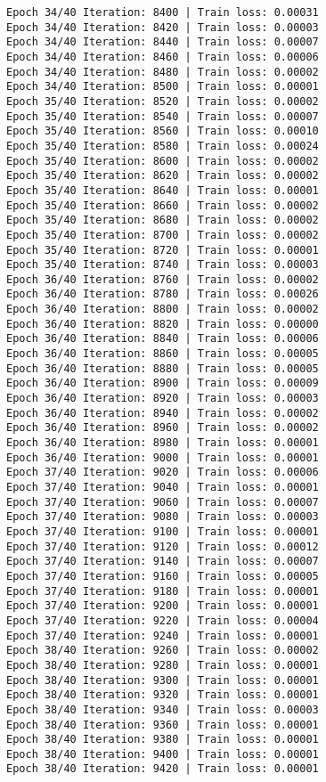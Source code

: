 \documentclass[11pt]{article}
\begin{document}
\begin{Verbatim}[commandchars=\\\{\}]
Epoch 34/40 Iteration: 8400 | Train loss: 0.00031
Epoch 34/40 Iteration: 8420 | Train loss: 0.00003
Epoch 34/40 Iteration: 8440 | Train loss: 0.00007
Epoch 34/40 Iteration: 8460 | Train loss: 0.00006
Epoch 34/40 Iteration: 8480 | Train loss: 0.00002
Epoch 34/40 Iteration: 8500 | Train loss: 0.00001
Epoch 35/40 Iteration: 8520 | Train loss: 0.00002
Epoch 35/40 Iteration: 8540 | Train loss: 0.00007
Epoch 35/40 Iteration: 8560 | Train loss: 0.00010
Epoch 35/40 Iteration: 8580 | Train loss: 0.00024
Epoch 35/40 Iteration: 8600 | Train loss: 0.00002
Epoch 35/40 Iteration: 8620 | Train loss: 0.00002
Epoch 35/40 Iteration: 8640 | Train loss: 0.00001
Epoch 35/40 Iteration: 8660 | Train loss: 0.00002
Epoch 35/40 Iteration: 8680 | Train loss: 0.00002
Epoch 35/40 Iteration: 8700 | Train loss: 0.00002
Epoch 35/40 Iteration: 8720 | Train loss: 0.00001
Epoch 35/40 Iteration: 8740 | Train loss: 0.00003
Epoch 36/40 Iteration: 8760 | Train loss: 0.00002
Epoch 36/40 Iteration: 8780 | Train loss: 0.00026
Epoch 36/40 Iteration: 8800 | Train loss: 0.00002
Epoch 36/40 Iteration: 8820 | Train loss: 0.00000
Epoch 36/40 Iteration: 8840 | Train loss: 0.00006
Epoch 36/40 Iteration: 8860 | Train loss: 0.00005
Epoch 36/40 Iteration: 8880 | Train loss: 0.00005
Epoch 36/40 Iteration: 8900 | Train loss: 0.00009
Epoch 36/40 Iteration: 8920 | Train loss: 0.00003
Epoch 36/40 Iteration: 8940 | Train loss: 0.00002
Epoch 36/40 Iteration: 8960 | Train loss: 0.00002
Epoch 36/40 Iteration: 8980 | Train loss: 0.00001
Epoch 36/40 Iteration: 9000 | Train loss: 0.00001
Epoch 37/40 Iteration: 9020 | Train loss: 0.00006
Epoch 37/40 Iteration: 9040 | Train loss: 0.00001
Epoch 37/40 Iteration: 9060 | Train loss: 0.00007
Epoch 37/40 Iteration: 9080 | Train loss: 0.00003
Epoch 37/40 Iteration: 9100 | Train loss: 0.00001
Epoch 37/40 Iteration: 9120 | Train loss: 0.00012
Epoch 37/40 Iteration: 9140 | Train loss: 0.00007
Epoch 37/40 Iteration: 9160 | Train loss: 0.00005
Epoch 37/40 Iteration: 9180 | Train loss: 0.00001
Epoch 37/40 Iteration: 9200 | Train loss: 0.00001
Epoch 37/40 Iteration: 9220 | Train loss: 0.00004
Epoch 37/40 Iteration: 9240 | Train loss: 0.00001
Epoch 38/40 Iteration: 9260 | Train loss: 0.00002
Epoch 38/40 Iteration: 9280 | Train loss: 0.00001
Epoch 38/40 Iteration: 9300 | Train loss: 0.00001
Epoch 38/40 Iteration: 9320 | Train loss: 0.00001
Epoch 38/40 Iteration: 9340 | Train loss: 0.00003
Epoch 38/40 Iteration: 9360 | Train loss: 0.00001
Epoch 38/40 Iteration: 9380 | Train loss: 0.00001
Epoch 38/40 Iteration: 9400 | Train loss: 0.00001
Epoch 38/40 Iteration: 9420 | Train loss: 0.00001

\end{Verbatim}
\end{document}
